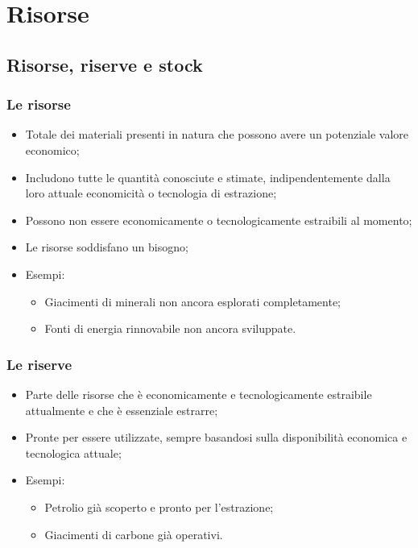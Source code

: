 \documentclass{article}
\begin{document}
\section{Risorse}

\subsection{Risorse, riserve e stock}

\subsubsection{Le risorse}
\begin{itemize}
    \item Totale dei materiali presenti in natura che possono avere un potenziale valore
        economico;
    \item Includono tutte le quantità conosciute e stimate, indipendentemente dalla loro
        attuale economicità o tecnologia di estrazione;
    \item Possono non essere economicamente o tecnologicamente estraibili al momento;
    \item Le risorse soddisfano un bisogno;
    \item Esempi:
        \begin{itemize}
            \item Giacimenti di minerali non ancora esplorati completamente;
            \item Fonti di energia rinnovabile non ancora sviluppate.
        \end{itemize}
\end{itemize}

\subsubsection{Le riserve}
\begin{itemize}
    \item Parte delle risorse che è economicamente e tecnologicamente estraibile attualmente
        e che è essenziale estrarre; 
    \item Pronte per essere utilizzate, sempre basandosi sulla disponibilità economica e
        tecnologica attuale;
    \item Esempi:
        \begin{itemize}
            \item Petrolio già scoperto e pronto per l'estrazione;
            \item Giacimenti di carbone già operativi.
        \end{itemize}
\end{itemize}
\end{document}
